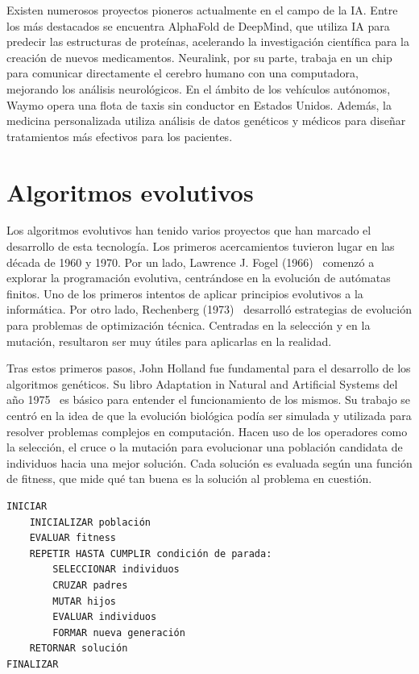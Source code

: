 Existen numerosos proyectos pioneros actualmente en el campo de la IA. Entre los más destacados se encuentra AlphaFold de DeepMind, que utiliza IA para predecir las estructuras de proteínas, acelerando la investigación científica para la creación de nuevos medicamentos. Neuralink, por su parte, trabaja en un chip para comunicar directamente el cerebro humano con una computadora, mejorando los análisis neurológicos. En el ámbito de los vehículos autónomos, Waymo opera una flota de taxis sin conductor en Estados Unidos. Además, la medicina personalizada utiliza análisis de datos genéticos y médicos para diseñar tratamientos más efectivos para los pacientes.


\section{Algoritmos evolutivos}

Los algoritmos evolutivos han tenido varios proyectos que han marcado el desarrollo de esta tecnología. Los primeros acercamientos tuvieron lugar en las década de 1960 y 1970. Por un lado, Lawrence J. Fogel (1966)~\cite{fogel1966} comenzó a explorar la programación evolutiva, centrándose en la evolución de autómatas finitos. Uno de los primeros intentos de aplicar principios evolutivos a la informática. Por otro lado, Rechenberg (1973)~\cite{rechenberg1973} desarrolló estrategias de evolución para problemas de optimización técnica. Centradas en la selección y en la mutación, resultaron ser muy útiles para aplicarlas en la realidad.

Tras estos primeros pasos, John Holland fue fundamental para el desarrollo de los algoritmos genéticos. Su libro Adaptation in Natural and Artificial Systems del año 1975~\cite{holland1975} es básico para entender el funcionamiento de los mismos. Su trabajo se centró en la idea de que la evolución biológica podía ser simulada y utilizada para resolver problemas complejos en computación. Hacen uso de los operadores como la selección, el cruce o la mutación para evolucionar una población candidata de individuos hacia una mejor solución. Cada solución es evaluada según una función de fitness, que mide qué tan buena es la solución al problema en cuestión.

\begin{lstlisting}[caption=Algoritmo Genético]
INICIAR
    INICIALIZAR población
    EVALUAR fitness
    REPETIR HASTA CUMPLIR condición de parada:
        SELECCIONAR individuos
        CRUZAR padres
        MUTAR hijos
        EVALUAR individuos
        FORMAR nueva generación
    RETORNAR solución
FINALIZAR
\end{lstlisting}

